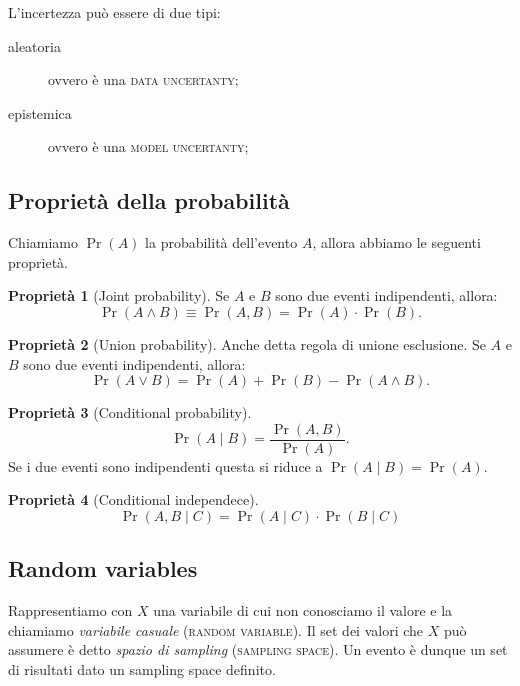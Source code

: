 \documentclass[10pt]{article}
\DeclareMathOperator{\pr}{Pr}
\newcommand{\im}[1]{\textsc{#1}}
\newcommand{\et}{\wedge}
\newcommand{\orr}{\vee}
\newcommand{\cond}{\mid}
\newcommand{\pare}[1]{
	\ensuremath{\left(#1\right)}
}
\theoremstyle{definition}
\newtheorem{property}{Proprietà}[subsection]
\begin{document}
L'incertezza può essere di due tipi:
\begin{description}
\item[aleatoria] ovvero è una \im{data uncertanty};
\item[epistemica] ovvero è una \im{model uncertanty};
\end{description}

\subsection{Proprietà della probabilità}
Chiamiamo $\pr(A)$ la probabilità dell'evento $A$, allora abbiamo le seguenti proprietà.

\begin{property}[Joint probability]
Se $A$ e $B$ sono due eventi indipendenti, allora:
\begin{equation}
\pr\pare{A\et B} \equiv \pr\pare{A, B} = \pr\pare{A} \cdot \pr\pare{B}.
\end{equation}
\end{property}

\begin{property}[Union probability]
Anche detta regola di unione esclusione. Se $A$ e $B$ sono due eventi indipendenti, allora:
\begin{equation}
\pr\pare{A\orr B} = \pr\pare{A} + \pr\pare{B} - \pr\pare{A\et B}.
\end{equation}
\end{property}

\begin{property}[Conditional probability]
\begin{equation}
\pr\pare{A\cond B} = \frac{\pr\pare{A, B}}{\pr\pare{A}}.
\end{equation}
Se i due eventi sono indipendenti questa si riduce a $\pr\pare{A\cond B} = \pr\pare{A}$.
\end{property}

\begin{property}[Conditional independece]
\begin{equation}
\pr\pare{A, B \cond C} = \pr\pare{A\cond C} \cdot \pr\pare{B\cond C}
\end{equation}
\end{property}

\subsection{Random variables}
Rappresentiamo con $X$ una variabile di cui non conosciamo il valore e la chiamiamo \textit{variabile casuale} (\im{random variable}). Il set dei valori che $X$ può assumere è detto \textit{spazio di sampling} (\im{sampling space}). Un evento è dunque un set di risultati dato un sampling space definito.
\end{document}
